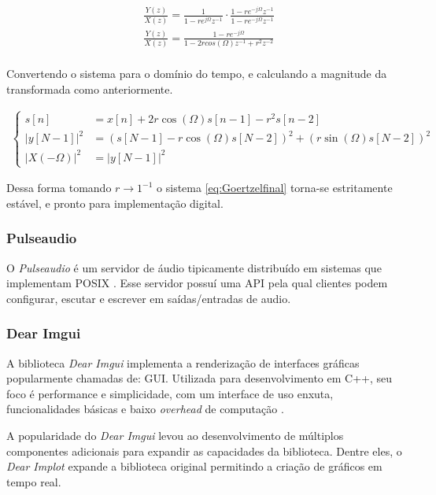 \begin{align*}
    &\frac{Y(z)}{X(z)} = \frac{1}{1 - re^{j\Omega}z^{-1}} \cdot \frac{1 - re^{-j\Omega}z^{-1}}{1 - re^{-j\Omega}z^{-1}}\\
    &\frac{Y(z)}{X(z)} = \frac{1 - re^{-j\Omega}}
    {1-2rcos(\Omega)z^{-1}+r^2z^{-2}}\\
\end{align*}

Convertendo o sistema para o domínio do tempo, e calculando a magnitude da transformada como anteriormente.

\begin{align}
    \label{eq:Goertzelfinal}
    \begin{cases}
        s[n] &= x[n] + 2r\cos(\Omega)s[n-1] - r^2s[n-2]\\
        \lvert y[N-1] \rvert^2 &= (s[N-1] - r\cos(\Omega)s[N-2])^2 + (r\sin(\Omega)s[N-2])^{2}\\
        \lvert X(-\Omega) \rvert^2 &= \lvert y[N-1] \rvert^2
    \end{cases}
\end{align}


Dessa forma tomando $r \to 1^{-1}$ o sistema \eqref{eq:Goertzelfinal} torna-se estritamente estável, e pronto para implementação digital.

\subsubsection{Pulseaudio}
\label{sub:pulseaudio}

O \textit{Pulseaudio} é um servidor de áudio tipicamente distribuído em sistemas que implementam \ac{POSIX} \cite{pulseaudio}. Esse servidor possuí uma \ac{API} pela qual clientes podem configurar, escutar e escrever em saídas/entradas de audio.

\subsubsection{Dear Imgui}
\label{sub:dear}

A biblioteca \textit{Dear Imgui} implementa a renderização de interfaces gráficas popularmente chamadas de: \ac{GUI}. Utilizada para desenvolvimento em C++, seu foco é performance e simplicidade, com um interface  de uso enxuta, funcionalidades básicas e baixo \textit{overhead} de computação \cite{imgui}. 

A popularidade do \textit{Dear Imgui} levou ao desenvolvimento de múltiplos componentes adicionais para expandir as capacidades da biblioteca. Dentre eles, o \textit{Dear Implot} \cite{implot} expande a biblioteca original permitindo a criação de gráficos em tempo real.